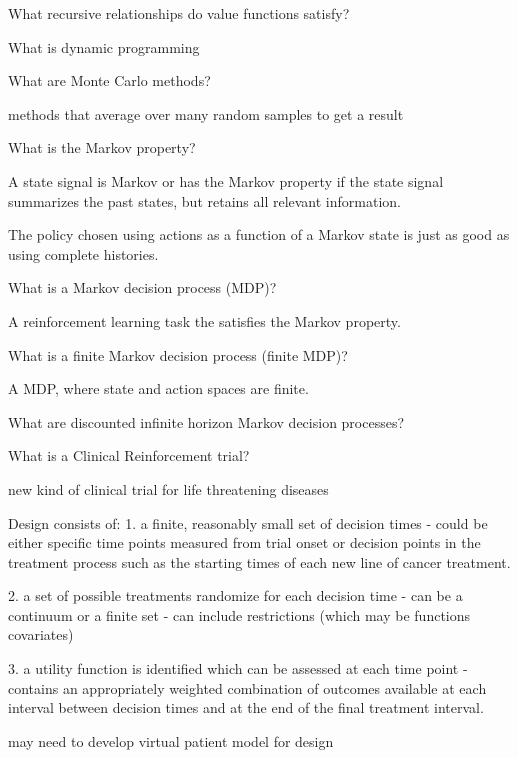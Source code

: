 \documentclass[10pt]{article}
\begin{document}
What recursive relationships do value functions satisfy?


\hrulefill

What is dynamic programming

\hrulefill

What are Monte Carlo methods?

methods that average over many random samples to get a result


\hrulefill

What is the Markov property?

A state signal is Markov or has the Markov property if the state signal summarizes the past states, but retains all relevant information. 

The policy chosen using actions as a function of a Markov state is just as good as using complete histories.

\hrulefill

What is a Markov decision process (MDP)?

A reinforcement learning task the satisfies the Markov property.   

\hrulefill

What is a finite Markov decision process (finite MDP)?

A MDP, where state and action spaces are finite.

\hrulefill

What are discounted infinite horizon Markov decision processes?

\hrulefill

What is a Clinical Reinforcement trial?

new kind of clinical trial for life threatening diseases

Design consists of:
1. a finite, reasonably small set of decision times
	- could be either specific time points measured from trial onset or decision points in the treatment process such as the starting times of each new line of cancer treatment. 

2. a set of possible treatments randomize for each decision time
	- can be a continuum or a finite set
	- can include restrictions (which may be functions covariates)

3. a utility function is identified which can be assessed at each time point
	- contains an appropriately weighted combination of outcomes available at each interval between decision times and at the end of the final treatment interval.
	
may need to develop virtual patient model for design 
\end{document}
